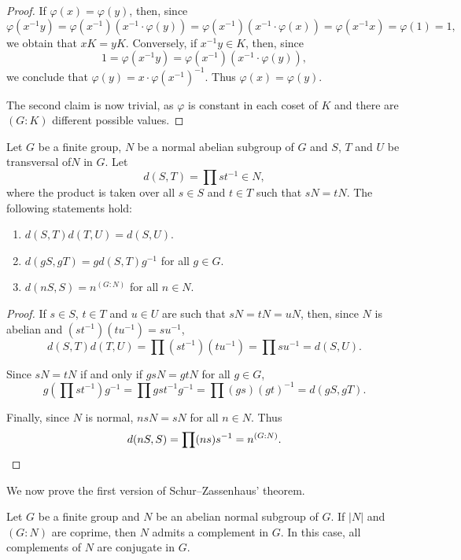\begin{proof}
	If $\varphi(x)=\varphi(y)$, then, since 
	\[
		\varphi(x^{-1}y)
		=\varphi(x^{-1})(x^{-1}\cdot\varphi(y))
		=\varphi(x^{-1})(x^{-1}\cdot\varphi(x))
		=\varphi(x^{-1}x)=\varphi(1)
		=1,
	\]
	we obtain that $xK=yK$. Conversely, if $x^{-1}y\in K$, then, since 
	\[
	1=\varphi(x^{-1}y)=\varphi(x^{-1})(x^{-1}\cdot \varphi(y)),
	\]
	we conclude that $\varphi(y)=x\cdot\varphi(x^{-1})^{-1}$. Thus
	$\varphi(x)=\varphi(y)$.

	The second claim is now trivial, as $\varphi$ is constant in each coset of $K$ and
	there are $(G:K)$ different possible values. 
\end{proof}

\begin{lemma}
	\label{lem:d}
	Let $G$ be a finite group, $N$ be a normal abelian subgroup of $G$ and $S$, $T$ and $U$
	be transversal of$N$ in $G$. Let  
	\[
	d(S,T)=\prod st^{-1}\in N,
	\]
	where the product is taken over all $s\in S$ and $t\in T$ such that 
	$sN=tN$. The following statements hold:
	\begin{enumerate}
		\item $d(S,T)d(T,U)=d(S,U)$.
		\item $d(gS,gT)=gd(S,T)g^{-1}$ for all $g\in G$.
		\item $d(nS,S)=n^{(G:N)}$ for all $n\in N$.
	\end{enumerate}
\end{lemma}

\begin{proof}
	If $s\in S$, $t\in T$ and $u\in U$ are such that $sN=tN=uN$, then, since $N$ is
	abelian and $(st^{-1})(tu^{-1})=su^{-1}$, 
	\[
		d(S,T)d(T,U)=\prod (st^{-1})(tu^{-1})=\prod su^{-1}=d(S,U).
	\]

	Since $sN=tN$ if and only if $gsN=gtN$ for all $g\in G$, 
	\[
	g\left(\prod st^{-1}\right)g^{-1}=\prod gst^{-1}g^{-1}=\prod (gs)(gt)^{-1}=d(gS,gT).
	\]

	Finally, since $N$ is normal, $nsN=sN$ for all $n\in N$. Thus 
	\[
		d(nS,S)=\prod (ns)s^{-1}=n^{(G:N)}.\qedhere
	\]
\end{proof}

We now prove the first version of Schur--Zassenhaus' theorem. 

\begin{theorem}
	\label{thm:SchurZassenhaus:abelian}
	Let $G$ be a finite group and $N$ be an abelian normal subgroup of $G$. If 
	$|N|$ and $(G:N)$ are coprime, then $N$ admits a complement in $G$. In this case, all complements
	of $N$ are conjugate in $G$.  
\end{theorem}

